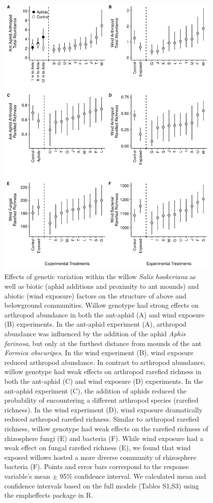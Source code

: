 \documentclass[11pt]{article}
\begin{document}
\begin{figure}[h!]
\centering
\includegraphics[scale = 0.08]{image03.png}
\caption{Effects of genetic variation within the willow
\emph{Salix hookeriana} as well as biotic (aphid additions and proximity
to ant mounds) and abiotic (wind exposure) factors on the structure of
above and belowground communities. Willow genotype had strong effects on
arthropod abundance in both the ant-aphid (A) and wind exposure (B)
experiments. In the ant-aphid experiment (A), arthropod abundance was
influenced by the addition of the aphid \emph{Aphis farinosa}, but only
at the furthest distance from mounds of the ant \emph{Formica
obscuripes}. In the wind experiment (B), wind exposure reduced arthropod
abundance. In contrast to arthropod abundance, willow genotype had weak
effects on arthropod rarefied richness in both the ant-aphid (C) and
wind exposure (D) experiments. In the ant-aphid experiment (C), the
addition of aphids reduced the probability of encountering a different
arthropod species (rarefied richness). In the wind experiment (D), wind
exposure dramatically reduced arthropod rarefied richness. Similar to
arthropod rarefied richness, willow genotype had weak effects on the
rarefied richness of rhizosphere fungi (E) and bacteria (F). While wind
exposure had a weak effect on fungal rarefied richness (E), we found
that wind exposed willows hosted a more diverse community of rhizosphere
bacteria (F). Points and error bars correspond to the response
variable's mean $\pm$ 95\% confidence interval. We calculated mean and confidence intervals based on the full models (Tables S1,S3) using the emph{effects} package in R.}
\label{Fig:GxEuni}
\end{figure}
\end{document}
